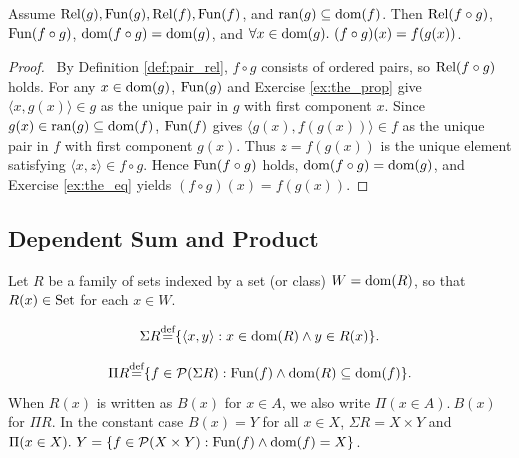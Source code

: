 \documentclass[10pt,a4paper]{article}
\renewcommand{\myprf}{\begin{proof}}
\renewcommand{\myqed}{\end{proof}}
\begin{document}
\begin{lemma}\label{lem:fun_comp}
Assume ${\textrm{Rel}}(g), {\textrm{Fun}}(g), {\textrm{Rel}}(f), {\textrm{Fun}}(f)$, and ${\textrm{ran}}(g) \subseteq {\textrm{dom}}(f)$. Then ${\textrm{Rel}}(f \circ g)$, ${\textrm{Fun}}(f \circ g)$, ${\textrm{dom}}(f \circ g) = {\textrm{dom}}(g)$, and $\forall x \in {\textrm{dom}}(g).\ (f \circ g)(x) = f(g(x))$.
\end{lemma}
\myprf\ By Definition \ref{def:pair_rel}, $f \circ g$ consists of ordered pairs, so ${\textrm{Rel}}(f \circ g)$ holds. For any $x \in {\textrm{dom}}(g)$, ${\textrm{Fun}}(g)$ and Exercise \ref{ex:the_prop} give $\langle x, g(x) \rangle \in g$ as the unique pair in $g$ with first component $x$. Since $g(x) \in {\textrm{ran}}(g) \subseteq {\textrm{dom}}(f)$, ${\textrm{Fun}}(f)$ gives $\langle g(x), f(g(x)) \rangle \in f$ as the unique pair in $f$ with first component $g(x)$. Thus $z = f(g(x))$ is the unique element satisfying $\langle x, z \rangle \in f \circ g$. Hence ${\textrm{Fun}}(f \circ g)$ holds, ${\textrm{dom}}(f \circ g) = {\textrm{dom}}(g)$, and Exercise \ref{ex:the_eq} yields $(f \circ g)(x) = f(g(x))$. \myqed

\subsection{Dependent Sum and Product}\label{sec:sigma_pi}
Let $R$ be a family of sets indexed by a set (or class) $W = {\textrm{dom}}(R)$, so that $R(x) \in {\textrm{Set}}$ for each $x \in W$.
\begin{definition}
$$\Sigma R {\stackrel{{\textrm{def}}}{=}} \{\langle x, y\rangle : x \in {\textrm{dom}}(R) \land y\in R(x)\}.$$
\end{definition}
\begin{definition}
$$\Pi R {\stackrel{{\textrm{def}}}{=}} \{ f\in {\mathcal{P}}(\Sigma R) : {\textrm{Fun}}(f) \land {\textrm{dom}}(R)\subseteq {\textrm{dom}}(f)\}.$$
When $R(x)$ is written as $B(x)$ for $x \in A$, we also write $\Pi(x \in A).\ B(x)$ for $\Pi R$. In the constant case $B(x) = Y$ for all $x \in X$, $\Sigma R = X \times Y$ and $\Pi(x \in X).\ Y = \{f \in {\mathcal{P}}(X \times Y) : {\textrm{Fun}}(f) \land {\textrm{dom}}(f) = X\}$.
\end{definition}
\end{document}
